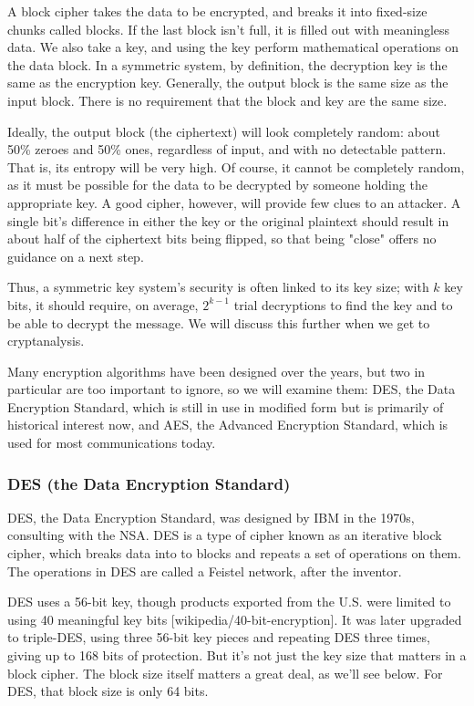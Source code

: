 \documentclass[%
 aip,
 jmp,%
 amsmath,amssymb,
 reprint,%
]{revtex4-1}
\begin{document}
A block cipher takes the data to be encrypted, and breaks it into
fixed-size chunks called blocks.  If the last block isn't full, it is
filled out with meaningless data.  We also take a key, and using the
key perform mathematical operations on the data block.  In a symmetric
system, by definition, the decryption key is the same as the
encryption key.  Generally, the output block is the same size as the
input block.  There is no requirement that the block and key are the
same size.

Ideally, the output block (the ciphertext) will look completely
random: about 50\% zeroes and 50\% ones, regardless of input, and with
no detectable pattern.  That is, its entropy will be very high.  Of
course, it cannot be completely random, as it must be possible for the
data to be decrypted by someone holding the appropriate key.  A good
cipher, however, will provide few clues to an attacker.  A single
bit's difference in either the key or the original plaintext should
result in about half of the ciphertext bits being flipped, so that
being "close" offers no guidance on a next step.

Thus, a symmetric key system's security is often linked to its key
size; with $k$ key bits, it should require, on average, $2^{k-1}$
trial decryptions to find the key and to be able to decrypt the
message.  We will discuss this further when we get to cryptanalysis.

Many encryption algorithms have been designed over the years, but two
in particular are too important to ignore, so we will examine them:
DES, the Data Encryption Standard, which is still in use in modified
form but is primarily of historical interest now, and AES, the
Advanced Encryption Standard, which is used for most communications
today.

\subsubsection{DES (the Data Encryption Standard)}

DES, the Data Encryption Standard, was designed by IBM in the 1970s,
consulting with the NSA.  DES is a type of cipher known as an
iterative block cipher, which breaks data into to blocks and repeats a
set of operations on them.  The operations in DES are called a Feistel
network, after the inventor.

DES uses a 56-bit key, though products exported from the U.S. were
limited to using 40 meaningful key bits [wikipedia/40-bit-encryption].
It was later upgraded to triple-DES, using three 56-bit key pieces and
repeating DES three times, giving up to 168 bits of protection.  But
it's not just the key size that matters in a block cipher.  The block
size itself matters a great deal, as we'll see below.  For DES, that
block size is only 64 bits.
\end{document}
